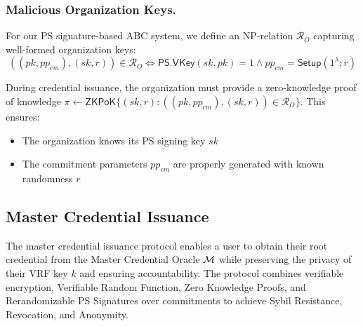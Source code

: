 {\newpage
\subsubsection{Malicious Organization Keys.}
For our PS signature-based ABC system, we define an NP-relation $\mathcal{R}_O$ capturing well-formed organization keys:
$$ ((pk, pp_{cm}), (sk, r)) \in \mathcal{R}_O \iff \mathsf{PS.VKey}(sk, pk) = 1 \land pp_{cm} = \mathsf{Setup}(1^\lambda; r) $$

During credential issuance, the organization must provide a zero-knowledge proof of knowledge 
$\pi \gets \mathsf{ZKPoK}\{(sk,r): ((pk, pp_{cm}), (sk,r)) \in \mathcal{R}_O\}$. 
This ensures:
\begin{itemize}
    \item The organization knows its PS signing key $sk$
    \item The commitment parameters $pp_{cm}$ are properly generated with known randomness $r$
\end{itemize}



























\newpage
\subsection{Master Credential Issuance}
The master credential issuance protocol enables a user to obtain their root credential from the Master Credential Oracle $\mathcal{M}$ while preserving the privacy of their VRF key $k$ and ensuring accountability. The protocol combines verifiable encryption, Verifiable Random Function, Zero Knowledge Proofs, and Rerandomizable PS Signatures over commitments to achieve Sybil Resistance, Revocation, and Anonymity.

}
